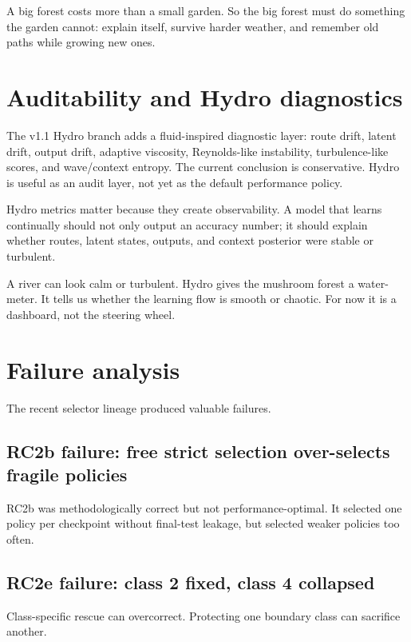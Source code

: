 \documentclass[11pt]{article}
\begin{document}
\begin{kidbox}
A big forest costs more than a small garden. So the big forest must do something the garden cannot: explain itself, survive harder weather, and remember old paths while growing new ones.
\end{kidbox}

\section{Auditability and Hydro diagnostics}

The v1.1 Hydro branch adds a fluid-inspired diagnostic layer: route drift, latent drift, output drift, adaptive viscosity, Reynolds-like instability, turbulence-like scores, and wave/context entropy. The current conclusion is conservative. Hydro is useful as an audit layer, not yet as the default performance policy.

Hydro metrics matter because they create observability. A model that learns continually should not only output an accuracy number; it should explain whether routes, latent states, outputs, and context posterior were stable or turbulent.

\begin{kidbox}
A river can look calm or turbulent. Hydro gives the mushroom forest a water-meter. It tells us whether the learning flow is smooth or chaotic. For now it is a dashboard, not the steering wheel.
\end{kidbox}

\section{Failure analysis}

The recent selector lineage produced valuable failures.

\subsection{RC2b failure: free strict selection over-selects fragile policies}
RC2b was methodologically correct but not performance-optimal. It selected one policy per checkpoint without final-test leakage, but selected weaker policies too often.

\subsection{RC2e failure: class 2 fixed, class 4 collapsed}
Class-specific rescue can overcorrect. Protecting one boundary class can sacrifice another.
\end{document}

